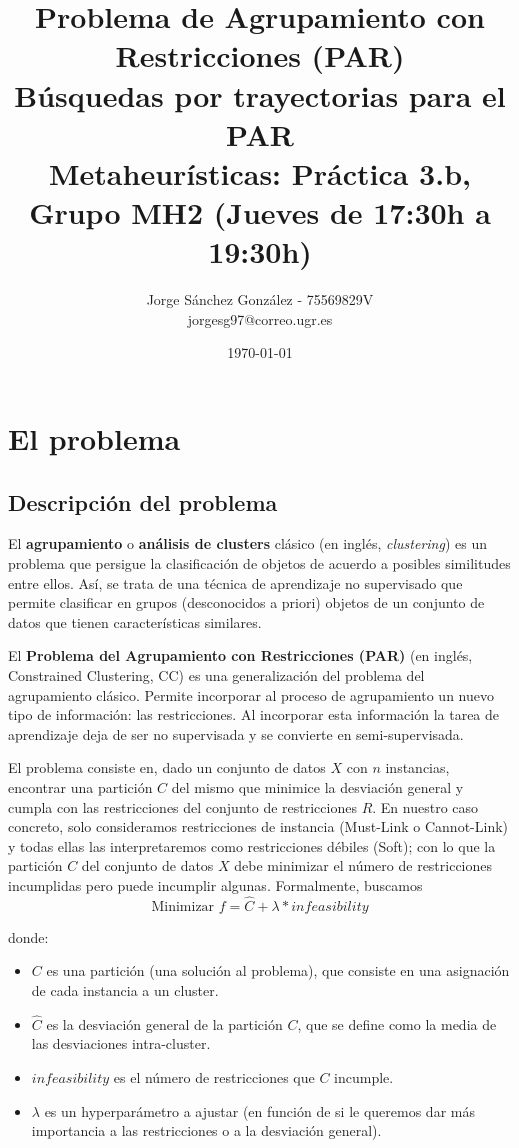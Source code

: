 \documentclass[11pt,a4paper]{article}
\title{Problema de Agrupamiento con Restricciones (PAR)
	\\\medskip \large Búsquedas por trayectorias para el PAR \\\medskip
	\large Metaheurísticas: Práctica 3.b, Grupo MH2 (Jueves de 17:30h a 19:30h)}
\author{Jorge Sánchez González - 75569829V \\ jorgesg97@correo.ugr.es}
\date{ \today }
\begin{document}
	
	
	\maketitle 
	\newpage
	\tableofcontents
	\newpage
	
	
	\section{El problema}
	
	\subsection{Descripción del problema}\label{sec:problema}
	El \textbf{agrupamiento} o \textbf{análisis de clusters} clásico (en inglés, \emph{clustering}) es un problema que persigue la clasificación de objetos de acuerdo a posibles similitudes entre ellos. Así, se trata de una técnica de aprendizaje no supervisado que permite clasificar en grupos (desconocidos a priori) objetos de un conjunto de datos que tienen características similares.
	
    El \textbf{Problema del Agrupamiento con Restricciones (PAR)} (en
    inglés, Constrained Clustering, CC) es una
    generalización del problema del agrupamiento clásico.
    Permite incorporar al proceso de agrupamiento un nuevo tipo
    de información: las restricciones. Al incorporar esta información la tarea de aprendizaje deja de ser no supervisada y se convierte en semi-supervisada. 
    
    El problema consiste en, dado un conjunto de datos $X$ con $n$ instancias, encontrar una partición $C$ del mismo que minimice la desviación general y cumpla con las restricciones del conjunto de restricciones $R$. En nuestro caso concreto, solo consideramos restricciones de instancia (Must-Link o Cannot-Link) y todas ellas las interpretaremos como restricciones débiles (Soft); con lo que la partición $C$ del conjunto de datos $X$ debe minimizar el número de restricciones incumplidas pero puede incumplir algunas. Formalmente, buscamos
    $$ \text{Minimizar } f = \hat{C} + \lambda * infeasibility$$
	
	donde:
	\begin{itemize}
		\item $C$ es una partición (una solución al problema), que consiste en una asignación de cada instancia a un cluster.
		\item $\hat{C}$ es la desviación general de la partición $C$, que se define como la media de las desviaciones intra-cluster.
		\item $infeasibility$ es el número de restricciones que $C$ incumple.
		\item $\lambda$ es un hyperparámetro a ajustar (en función de si le queremos dar más importancia a las restricciones o a la desviación general).
		
	\end{itemize}
\end{document}
